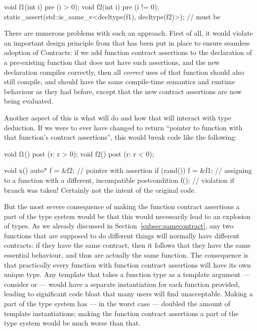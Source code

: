 \begin{codeblock}
void f1(int i) pre (i > 0);
void f2(int i) pre (i != 0);
static_assert(std::is_same_v<decltype(f1), decltype(f2)>);  // must be 
\end{codeblock}
There are numerous problems with such an approach. First of all, it would violate an important design principle from \cite{P2900R7} that has been put in place to ensure seamless adoption of Contracts: if we add function contract assertions to the declaration of a pre-existing function that does not have such assertions, and the new declaration compiles correctly, then all \emph{correct} uses of that function should also still compile, and should have the same compile-time semantics and runtime behaviour as they had before, except that the new contract assertions are now being evaluated.

Another aspect of this is what  will do and how that will interact with type deduction. If we were to ever have  changed to return ``pointer to function with that function's contract assertions'', this would break code like the following:
\begin{codeblock}
void f1() post (r: r > 0);
void f2() post (r: r < 0);

void x() {
  auto* f = &f2;   // pointer with assertion 
  if (rand()) {
    f = &f1;  // assigning to a function with a different, incompatible postcondition
  }
  f();  // violation if branch was taken! Certainly not the intent of the original code.
}
\end{codeblock}
But the most severe consequence of making the function contract assertions a part of the type system would be that this would necessarily lead to an explosion of types. As we already discussed in Section~\ref{subsec:samecontract}, any two functions that are supposed to do different things will normally have different contracts: if they have the same contract, then it follows that they have the same essential behaviour, and thus are actually the same function. The consequence is that practically every function with function contract assertions will have its own unique type. Any template that takes a function type as a template argument --- consider  or  --- would have a separate instantiation for each function provided, leading to significant code bloat that many users will find unacceptable. Making  a part of the type system has --- in the worst case --- doubled the amount of template instantiations; making the function contract assertions a part of the type system would be much worse than that.

